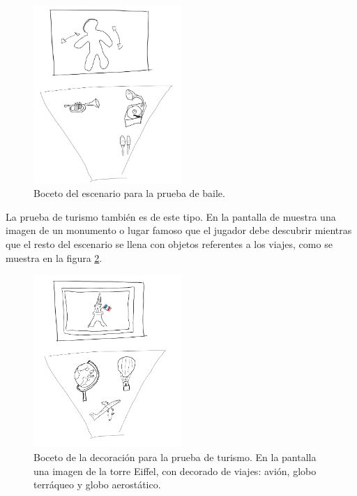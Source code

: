 \begin{figure}
  \centering
    \includegraphics[width=0.5\textwidth]{04.Desarrollo/03.Entrega3/01.Iteracion3_1/00.Figuras/05.baile.png}
    \caption{Boceto del escenario para la prueba de baile.}
    \label{fig:E3_baile}
\end{figure}

La prueba de turismo también es de este tipo. En la pantalla de muestra una imagen de un monumento o lugar famoso que el jugador debe descubrir mientras que el resto del escenario se llena con objetos referentes a los viajes, como se muestra en la figura \ref{fig:E3_turismo}.

\begin{figure}
  \centering
    \includegraphics[width=0.5\textwidth]{04.Desarrollo/03.Entrega3/01.Iteracion3_1/00.Figuras/06.turismo.png}
    \caption{Boceto de la decoración para la prueba de turismo. En la pantalla una imagen de la torre Eiffel, con decorado de viajes: avión, globo terráqueo y globo aerostático.}
    \label{fig:E3_turismo}
\end{figure}



